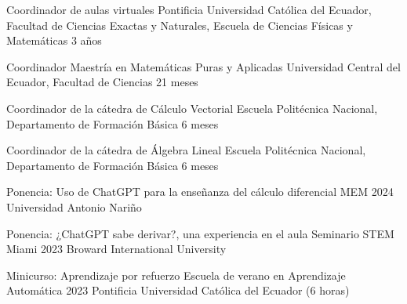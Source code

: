 \documentclass[
	a4paper,
	maincolor=cvblue!70!blue,
	sidecolor=gray!30,
	sectioncolor=cvblue!70!blue,
    sidebarwidth=7.5cm,
	topbottommargin=20pt,
	leftrightmargin=20pt,
]{fortysecondscv}
\begin{document}
    {Coordinador de aulas virtuales}
    {Pontificia Universidad Católica del Ecuador, Facultad de Ciencias Exactas y Naturales, Escuela de Ciencias Físicas y Matemáticas}
    {3 años}
    
    {Coordinador Maestría en Matemáticas Puras y Aplicadas}
    {Universidad Central del Ecuador, Facultad de Ciencias}
    {21 meses}
    
    {Coordinador de la cátedra de Cálculo Vectorial}
    {Escuela Politécnica Nacional, Departamento de Formación Básica}
    {6 meses}
    
    {Coordinador de la cátedra de Álgebra Lineal}
    {Escuela Politécnica Nacional, Departamento de Formación Básica}
    {6 meses}
    



\newpage
{}



    {Ponencia: Uso de ChatGPT para la enseñanza del cálculo diferencial}
    {MEM 2024}
    {Universidad Antonio Nariño}
    
    
    {Ponencia: ¿ChatGPT sabe derivar?, una experiencia en el aula}
    {Seminario STEM Miami 2023}
    {Broward International University}
    
    
    {Minicurso: Aprendizaje por refuerzo}
    {Escuela de verano en Aprendizaje Automática 2023}
    {Pontificia Universidad Católica del Ecuador (6 horas)}
    
\end{document}
